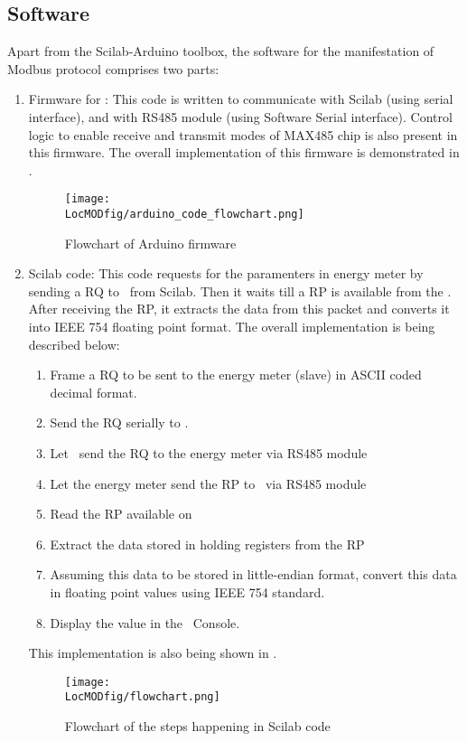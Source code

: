 \subsection{Software}
Apart from the Scilab-Arduino toolbox, the software for the 
manifestation of Modbus protocol comprises two parts:
\begin{enumerate}
\item  Firmware for \arduino: This code is written to communicate
with Scilab (using serial interface), and with RS485 module (using
Software Serial interface). Control logic to enable receive and
transmit modes of MAX485 chip is also present in this firmware. 
The overall implementation of this firmware is demonstrated in
.

\begin{figure}
  \centering
  \texttt{[image: \\LocMODfig/arduino\_code\_flowchart.png]}
  \caption{Flowchart of Arduino firmware}
  \label{fig:modbus-firmware}
\end{figure}

\item Scilab code: This code requests for the paramenters in energy meter
by sending a RQ to \arduino\ from Scilab. Then it waits till
a RP is available from the \arduino. After receiving the RP, it extracts 
the data from this packet and converts it into IEEE
754 floating point format. The overall implementation is being
described below:

\begin {enumerate}
\item Frame a RQ to be sent to the energy meter (slave) in ASCII coded decimal
format. 
\item Send the RQ serially to \arduino. 
\item Let \arduino\ send the RQ to the energy meter via RS485 module
\item Let the energy meter send the RP to \arduino\ via RS485 module
\item Read the RP available on \arduino\
\item Extract the data stored in holding registers from the RP
\item Assuming this data to be stored in little-endian format, 
convert this data in floating point values using IEEE 754 standard. 
\item Display the value in the \scilab\ Console. 
\end{enumerate}
This implementation is also being shown in . 
\begin{figure}
  \centering
  \texttt{[image: \\LocMODfig/flowchart.png]}
  \caption{Flowchart of the steps happening in Scilab code}
  \label{fig:flow-chart}
\end{figure}

\end{enumerate}

